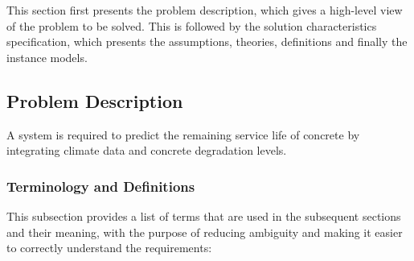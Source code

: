 \documentclass[12pt]{article}
\begin{document}
This section first presents the problem description, which gives a high-level view of the problem to be solved.  This is followed by the solution characteristics specification, which presents the assumptions, theories, definitions and finally
the instance models. 

\subsection{Problem Description} \label{Sec_pd}

A system is required to predict the remaining service life of concrete by integrating climate data and concrete degradation levels.

\subsubsection{Terminology and  Definitions}

This subsection provides a list of terms that are used in the subsequent sections and their meaning, with the purpose of reducing ambiguity and making it easier to correctly understand the requirements:
\end{document}

